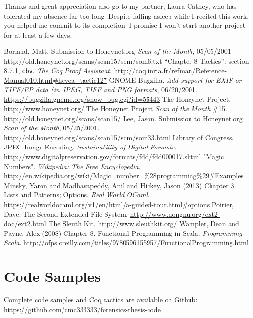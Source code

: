 \documentclass[nocopyrightspace,preprint]{sigplanconf}
\begin{document}
Thanks and great appreciation also go to my partner, Laura Cathey, who has
tolerated my absence far too long. Despite falling asleep while I recited this
work, you helped me commit to its completion. I promise I won't start another
project for at least a few days.





\begin{thebibliography}{}
\softraggedright

  Borland, Matt. Submission to Honeynet.org \emph{Scan of the Month},
  05/05/2001. \url{http://old.honeynet.org/scans/scan15/som/som6.txt}
  ``Chapter 8 Tactics''; section 8.7.1, {\tt cbv}. {\em The Coq Proof
  Assistant}.
  \url{http://coq.inria.fr/refman/Reference-Manual010.html#hevea\_tactic127}
  GNOME Bugzilla. {\em Add support for EXIF or TIFF/EP data (in JPEG, TIFF and
  PNG formats}, 06/20/2001.
  \url{https://bugzilla.gnome.org/show\_bug.cgi?id=56443}
  The Honeynet Project. \url{http://www.honeynet.org/}
  The Honeynet Project \emph{Scan of the Month} \#15.
  \url{http://old.honeynet.org/scans/scan15/}
  Lee, Jason. Submission to Honeynet.org \emph{Scan of the Month}, 05/25/2001.
  \url{http://old.honeynet.org/scans/scan15/som/som33.html}
  Library of Congress. JPEG Image Encoding. {\em Sustainability of Digital
  Formats}.
  \url{http://www.digitalpreservation.gov/formats/fdd/fdd000017.shtml}
  "Magic Numbers". {\em Wikipedia: The Free Encyclopedia}.
  \url{http://en.wikipedia.org/wiki/Magic\_number\_\%28programming\%29#Examples}
  Minsky, Yaron and Madhavapeddy, Anil and Hickey, Jason (2013) Chapter 3.
  Lists and Patterns; Options. {\em Real World OCaml}.
  \url{https://realworldocaml.org/v1/en/html/a-guided-tour.html#options}
  Poirier, Dave. The Second Extended File System.
  \url{http://www.nongnu.org/ext2-doc/ext2.html}
  The Sleuth Kit. \url{http://www.sleuthkit.org/}
  Wampler, Dean and Payne, Alex (2008) Chapter 8. Functional Programming in
  Scala. {\em Programming Scala}. 
  \url{http://ofps.oreilly.com/titles/9780596155957/FunctionalProgramming.html}

\end{thebibliography}

\appendix

\section{Code Samples}
Complete code samples and Coq tactics are available on Github:
\url{https://github.com/cmc333333/forensics-thesis-code}
\end{document}
